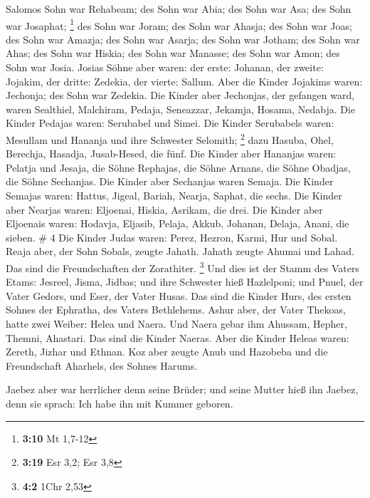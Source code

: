  Salomos Sohn war Rehabeam; des Sohn war Abia; des Sohn
war Asa; des Sohn war Josaphat; \footnote{\textbf{3:10} Mt 1,7-12}
 des Sohn war Joram; des Sohn war Ahasja; des Sohn war
Joas;  des Sohn war Amazja; des Sohn war Asarja; des Sohn
war Jotham;  des Sohn war Ahas; des Sohn war Hiskia; des
Sohn war Manasse;  des Sohn war Amon; des Sohn war Josia.
 Josias Söhne aber waren: der erste: Johanan, der zweite:
Jojakim, der dritte: Zedekia, der vierte: Sallum.  Aber
die Kinder Jojakims waren: Jechonja; des Sohn war Zedekia.
 Die Kinder aber Jechonjas, der gefangen ward, waren
Sealthiel,  Malchiram, Pedaja, Seneazzar, Jekamja,
Hosama, Nedabja.  Die Kinder Pedajas waren: Serubabel und
Simei. Die Kinder Serubabels waren: Mesullam und Hananja und ihre
Schwester Selomith; \footnote{\textbf{3:19} Esr 3,2; Esr 3,8}
 dazu Hasuba, Ohel, Berechja, Hasadja, Jusab-Hesed, die
fünf.  Die Kinder aber Hananjas waren: Pelatja und
Jesaja, die Söhne Rephajas, die Söhne Arnans, die Söhne Obadjas, die
Söhne Sechanjas.  Die Kinder aber Sechanjas waren Semaja.
Die Kinder Semajas waren: Hattus, Jigeal, Bariah, Nearja, Saphat, die
sechs.  Die Kinder aber Nearjas waren: Eljoenai, Hiskia,
Asrikam, die drei.  Die Kinder aber Eljoenais waren:
Hodavja, Eljasib, Pelaja, Akkub, Johanan, Delaja, Anani, die sieben. \#
4  Die Kinder Judas waren: Perez, Hezron, Karmi, Hur und
Sobal.  Reaja aber, der Sohn Sobals, zeugte Jahath. Jahath
zeugte Ahumai und Lahad. Das sind die Freundschaften der Zorathiter.
\footnote{\textbf{4:2} 1Chr 2,53}  Und dies ist der Stamm
des Vaters Etams: Jesreel, Jisma, Jidbas; und ihre Schwester hieß
Hazlelponi;  und Pnuel, der Vater Gedors, und Eser, der
Vater Husas. Das sind die Kinder Hurs, des ersten Sohnes der Ephratha,
des Vaters Bethlehems.  Ashur aber, der Vater Thekoas,
hatte zwei Weiber: Helea und Naera.  Und Naera gebar ihm
Ahussam, Hepher, Themni, Ahastari. Das sind die Kinder Naeras.
 Aber die Kinder Heleas waren: Zereth, Jizhar und Ethnan.
 Koz aber zeugte Anub und Hazobeba und die Freundschaft
Aharhels, des Sohnes Harums.

 Jaebez aber war herrlicher denn seine Brüder; und seine
Mutter hieß ihn Jaebez, denn sie sprach: Ich habe ihn mit Kummer
geboren.

